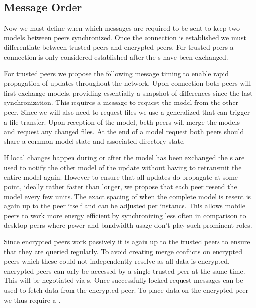 \subsection{Message Order}
\label{sub:Message Order}

Now we must define when which messages are required to be sent to keep two models between peers synchronized.
Once the connection is established we must differentiate between trusted peers and encrypted peers.
For trusted peers a connection is only considered established after the s have been exchanged.

For trusted peers we propose the following message timing to enable rapid propagation of updates throughout the network.
Upon connection both peers will first exchange models, providing essentially a snapshot of differences since the last synchronization.
This requires a message to request the model from the other peer.
Since we will also need to request files we use a generalized  that can trigger a file transfer.
Upon reception of the model, both peers will merge the models and request any changed files.
At the end of a model request both peers should share a common model state and associated directory state.

If local changes happen during or after the model has been exchanged the s are used to notify the other model of the update without having to retransmit the entire model again.
However to ensure that all updates do propagate at some point, ideally rather faster than longer, we propose that each peer resend the model every few units.
The exact spacing of when the complete model is resent is again up to the peer itself and can be adjusted per instance.
This allows mobile peers to work more energy efficient by synchronizing less often in comparison to desktop peers where power and bandwidth usage don't play such prominent roles.

Since encrypted peers work passively it is again up to the trusted peers to ensure that they are queried regularly.
To avoid creating merge conflicts on encrypted peers which these could not independently resolve as all data is encrypted, encrypted peers can only be accessed by a single trusted peer at the same time.
This will be negotiated via s.
Once successfully locked request messages can be used to fetch data from the encrypted peer.
To place data on the encrypted peer we thus require a .

